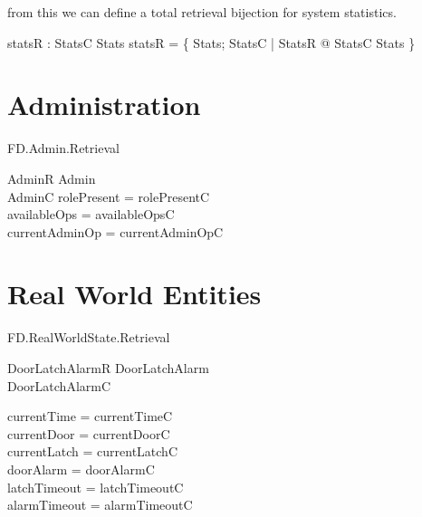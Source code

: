 from this we can define a total retrieval bijection for system
statistics.

\begin{axdef}
        statsR : StatsC \bij Stats
\where
        statsR = \{ Stats; StatsC | StatsR @ \theta StatsC \mapsto \theta Stats \}
\end{axdef}

\section{Administration}

\begin{traceunit}{FD.Admin.Retrieval}
\end{traceunit}


\begin{schema}{AdminR}
        Admin
\\      AdminC
\where
        rolePresent = rolePresentC
\\      availableOps = availableOpsC
\\      currentAdminOp = currentAdminOpC
\end{schema}

\section{Real World Entities}

\begin{traceunit}{FD.RealWorldState.Retrieval}
\end{traceunit}



\begin{schema}{DoorLatchAlarmR}
        DoorLatchAlarm
\\      DoorLatchAlarmC
\where

	currentTime = currentTimeC
\\	currentDoor = currentDoorC
\\	currentLatch = currentLatchC
\\	doorAlarm = doorAlarmC
\\	latchTimeout = latchTimeoutC
\\	alarmTimeout = alarmTimeoutC
\end{schema}


